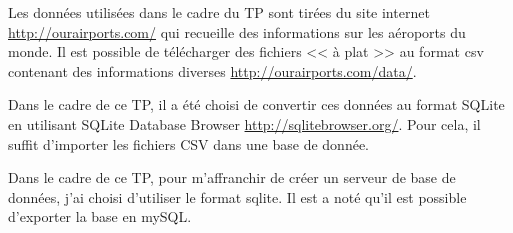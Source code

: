 \documentclass[10pt]{article}
\begin{document}




 \renewcommand{\baselinestretch}{1.2}
\setlength{\parskip}{2ex plus 0.5ex minus 0.2ex}



Les données utilisées dans le cadre du TP sont tirées du site internet \url{http://ourairports.com/} qui recueille des informations sur les aéroports du monde. Il est possible de télécharger des fichiers << à plat >> au format csv contenant des informations diverses \url{http://ourairports.com/data/}.

 Dans le cadre de ce TP, il a été choisi de convertir ces données au format SQLite en utilisant  SQLite Database Browser \url{http://sqlitebrowser.org/}. Pour cela, il suffit d'importer les fichiers CSV dans une base de donnée. 
 
Dans le cadre de ce TP, pour m'affranchir de créer un serveur de base de données, j'ai choisi d'utiliser le format sqlite. Il est a noté qu'il est possible d'exporter la base en mySQL. 
\end{document}
